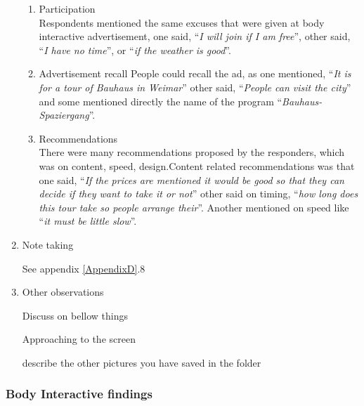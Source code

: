 \begin{enumerate}
\begin{enumerate}
\item  Participation \\
Respondents mentioned the same excuses that were given at body interactive advertisement, one said, ``\emph{I will join if I am free}'', other said, ``\emph{I have no time}'', or ``\emph{if the weather is good}''. 

\item  Advertisement recall
People could recall the ad, as one mentioned, ``\emph{It is for a tour of Bauhaus in Weimar}'' other said, ``\emph{People can visit the city}'' and some mentioned directly the name of the program ``\emph{Bauhaus-Spaziergang}''.

\item Recommendations \\
There were many recommendations proposed by the responders, which was on content, speed, design.Content related recommendations was that one said, ``\emph{If the prices are mentioned it would be good so that they can decide if they want to take it or not}'' other said on timing, ``\emph{how long does this tour take so people arrange their}''. Another mentioned on speed like ``\emph{it must be little slow}''.

\end{enumerate}


\item Note taking


See appendix  \ref{AppendixD}.8


\item Other observations

Discuss on bellow things

Approaching to the screen

describe the other pictures you have saved in the folder


\end{enumerate}


\subsubsection{Body Interactive findings}

